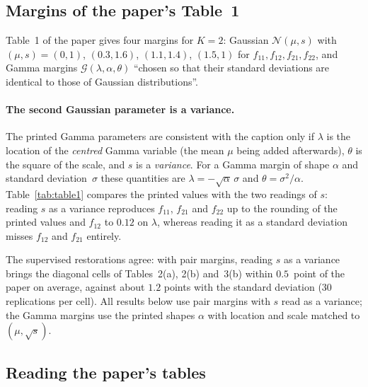 \documentclass[11pt,a4paper]{article}
\begin{document}
\subsection{Margins of the paper's Table~1}\label{sec:margins}

Table~1 of the paper gives four margins for $K=2$: Gaussian
$\mathcal N(\mu,s)$ with $(\mu,s)=(0,1)$, $(0.3,1.6)$, $(1.1,1.4)$, $(1.5,1)$
for $f_{11},f_{12},f_{21},f_{22}$, and Gamma margins
$\mathcal G(\lambda,\alpha,\theta)$ ``chosen so that their standard deviations
are identical to those of Gaussian distributions''.

\paragraph{The second Gaussian parameter is a variance.} The printed Gamma
parameters are consistent with the caption only if $\lambda$ is the location
of the \emph{centred} Gamma variable (the mean $\mu$ being added afterwards),
$\theta$ is the square of the scale, and $s$ is a \emph{variance}. For a Gamma
margin of shape $\alpha$ and standard deviation~$\sigma$ these quantities are
$\lambda=-\sqrt\alpha\,\sigma$ and $\theta=\sigma^2/\alpha$.
Table~\ref{tab:table1} compares the printed values with the two readings of
$s$: reading $s$ as a variance reproduces $f_{11}$, $f_{21}$ and $f_{22}$ up
to the rounding of the printed values and $f_{12}$ to $0.12$ on $\lambda$, whereas reading it as a standard
deviation misses $f_{12}$ and $f_{21}$ entirely.

\begin{table}[htbp]
  \centering\small
  \caption{Gamma parameters of Table~1: printed, and implied by each reading
           of the Gaussian parameter~$s$ ($\lambda=-\sqrt\alpha\,\sigma$,
           $\theta=\sigma^2/\alpha$, with $\sigma=s$ or $\sigma=\sqrt s$).}
  \label{tab:table1}
  
\end{table}

The supervised restorations agree: with pair margins, reading $s$ as a
variance brings the diagonal cells of Tables~2(a), 2(b) and~3(b) within
$0.5$~point of the paper on average, against about $1.2$ points with the
standard deviation (30 replications per cell). All results below use pair margins
with $s$ read as a variance; the Gamma margins use the printed shapes
$\alpha$ with location and scale matched to $(\mu,\sqrt s)$.

\subsection{Reading the paper's tables}\label{sec:orientation}
\end{document}
